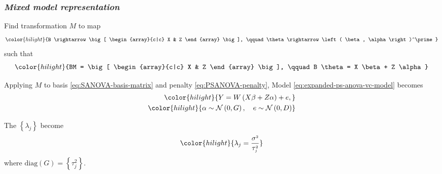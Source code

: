 \documentclass[12pt]{beamer}
\newcommand{\newmaththought}[1]{{ \color{hilight} {#1}}}
\newcommand{\ms}{\scriptscriptstyle}
\begin{document}
\begin{frame}
\frametitle{\emph{Mixed model representation}}

Find transformation $M$ to map
\begin{equation*}
\newmaththought{B \rightarrow \big[ \begin{array}{c|c} X & Z \end{array}  \big], \qquad \theta \rightarrow \left( \beta, \alpha \right)^\prime}
\end{equation*}
\noindent
such that 
\begin{equation*}
\newmaththought{BM = \big[ \begin{array}{c|c} X & Z \end{array}  \big], \qquad B \theta = X \beta + Z \alpha}
\end{equation*}


Applying $M$ to basis \ref{eq:SANOVA-basis-matrix} and penalty \ref{eq:PSANOVA-penalty}, Model \ref{eq:expanded-ps-anova-vc-model} becomes
\begin{align} 
\begin{split} \label{eq:vc-mixed-effects-model}
\newmaththought{Y = W\left(X \beta + Z \alpha\right) + e, }\\
\newmaththought{ \alpha \sim \mathcal{N}\left(0,G \right), \quad e\sim\mathcal{N}\left(0, D \right)}
\end{split}
\end{align} 

\noindent
The $\left\{ \lambda_j \right \}$ become
\[
\newmaththought{\lambda_j  = \frac{\sigma^{\ms 2} }{\tau_{\ms j}^{\ms 2}}}
\]
where $\mbox{diag}\left(G\right) = \left\{ \tau_{\ms j}^{\ms 2} \right\}$. 
\end{frame}
\end{document}

